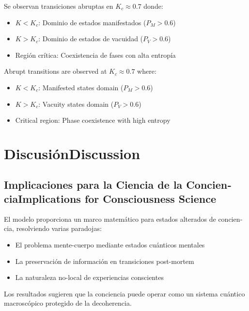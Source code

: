 \documentclass[12pt,a4paper]{article}
\newcommand{\es}[1]{\foreignlanguage{spanish}{#1}}
\newcommand{\en}[1]{\foreignlanguage{english}{#1}}
\begin{document}
\begin{otherlanguage}{spanish}
Se observan transiciones abruptas en $K_c \approx 0.7$ donde:
\begin{itemize}
\item $K < K_c$: Dominio de estados manifestados ($P_M > 0.6$)
\item $K > K_c$: Dominio de estados de vacuidad ($P_V > 0.6$)
\item Región crítica: Coexistencia de fases con alta entropía
\end{itemize}
\end{otherlanguage}

\begin{otherlanguage}{english}
Abrupt transitions are observed at $K_c \approx 0.7$ where:
\begin{itemize}
\item $K < K_c$: Manifested states domain ($P_M > 0.6$)
\item $K > K_c$: Vacuity states domain ($P_V > 0.6$)
\item Critical region: Phase coexistence with high entropy
\end{itemize}
\end{otherlanguage}

\section{\es{Discusión}\en{Discussion}}

\subsection{\es{Implicaciones para la Ciencia de la Conciencia}\en{Implications for Consciousness Science}}

\begin{otherlanguage}{spanish}
El modelo proporciona un marco matemático para estados alterados de conciencia, resolviendo varias paradojas:
\begin{itemize}
\item El problema mente-cuerpo mediante estados cuánticos mentales
\item La preservación de información en transiciones post-mortem
\item La naturaleza no-local de experiencias conscientes
\end{itemize}

Los resultados sugieren que la conciencia puede operar como un sistema cuántico macroscópico protegido de la decoherencia.
\end{otherlanguage}
\end{document}
